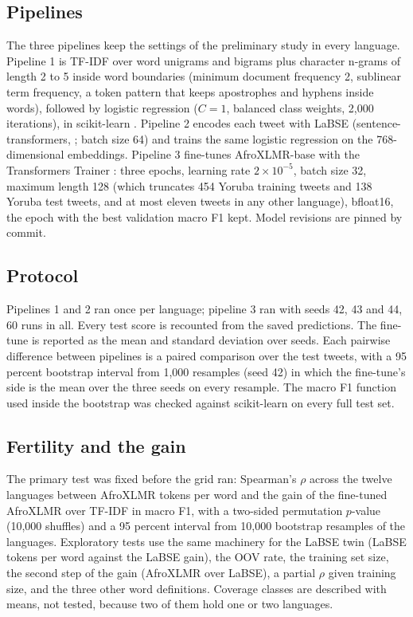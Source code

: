 \documentclass[11pt]{article}
\begin{document}
\subsection{Pipelines}
The three pipelines keep the settings of the preliminary study in every language. Pipeline 1 is TF-IDF over word unigrams and bigrams plus character n-grams of length 2 to 5 inside word boundaries (minimum document frequency 2, sublinear term frequency, a token pattern that keeps apostrophes and hyphens inside words), followed by logistic regression ($C = 1$, balanced class weights, 2,000 iterations), in scikit-learn \citep{pedregosa2011sklearn}. Pipeline 2 encodes each tweet with LaBSE (sentence-transformers, \citealp{reimers2019sbert}; batch size 64) and trains the same logistic regression on the 768-dimensional embeddings. Pipeline 3 fine-tunes AfroXLMR-base with the Transformers Trainer \citep{wolf2020transformers}: three epochs, learning rate $2 \times 10^{-5}$, batch size 32, maximum length 128 (which truncates 454 Yoruba training tweets and 138 Yoruba test tweets, and at most eleven tweets in any other language), bfloat16, the epoch with the best validation macro F1 kept. Model revisions are pinned by commit.

\subsection{Protocol}
Pipelines 1 and 2 ran once per language; pipeline 3 ran with seeds 42, 43 and 44, 60 runs in all. Every test score is recounted from the saved predictions. The fine-tune is reported as the mean and standard deviation over seeds. Each pairwise difference between pipelines is a paired comparison over the test tweets, with a 95 percent bootstrap interval from 1,000 resamples (seed 42) in which the fine-tune's side is the mean over the three seeds on every resample. The macro F1 function used inside the bootstrap was checked against scikit-learn on every full test set.

\subsection{Fertility and the gain}
The primary test was fixed before the grid ran: Spearman's $\rho$ across the twelve languages between AfroXLMR tokens per word and the gain of the fine-tuned AfroXLMR over TF-IDF in macro F1, with a two-sided permutation $p$-value (10,000 shuffles) and a 95 percent interval from 10,000 bootstrap resamples of the languages. Exploratory tests use the same machinery for the LaBSE twin (LaBSE tokens per word against the LaBSE gain), the OOV rate, the training set size, the second step of the gain (AfroXLMR over LaBSE), a partial $\rho$ given training size, and the three other word definitions. Coverage classes are described with means, not tested, because two of them hold one or two languages.
\end{document}
